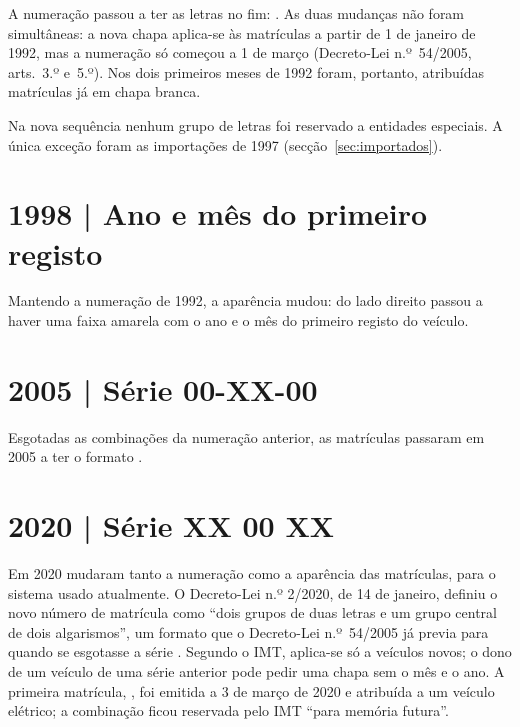 A numeração passou a ter as letras no fim: . As duas mudanças
não foram simultâneas: a nova chapa aplica-se às matrículas a partir de
1 de janeiro de 1992, mas a numeração  só começou a 1 de março
(Decreto-Lei n.º~54/2005, arts.~3.º e~5.º). Nos dois primeiros meses de 1992
foram, portanto, atribuídas matrículas  já em chapa branca.

Na nova sequência nenhum grupo de letras foi reservado a entidades especiais. A
única exceção foram as importações de 1997 (secção~\ref{sec:importados}).


\section{1998 | Ano e mês do primeiro registo}

Mantendo a numeração de 1992, a aparência mudou: do lado direito passou a haver
uma faixa amarela com o ano e o mês do primeiro registo do veículo.


\section{2005 | Série 00-XX-00}

Esgotadas as combinações da numeração anterior, as matrículas passaram em 2005 a
ter o formato .


\section{2020 | Série XX 00 XX}

Em 2020 mudaram tanto a numeração como a aparência das matrículas, para o
sistema usado atualmente. O Decreto-Lei n.º 2/2020, de 14 de janeiro, definiu o
novo número de matrícula como “dois grupos de duas letras e um grupo central de
dois algarismos”, um formato que o Decreto-Lei n.º~54/2005 já previa para quando
se esgotasse a série . Segundo o IMT, aplica-se só a veículos
novos; o dono de um veículo de uma série anterior pode pedir uma chapa sem o mês
e o ano. A primeira matrícula, , foi emitida a 3 de março
de 2020 e atribuída a um veículo elétrico; a combinação  ficou
reservada pelo IMT “para memória futura”.

